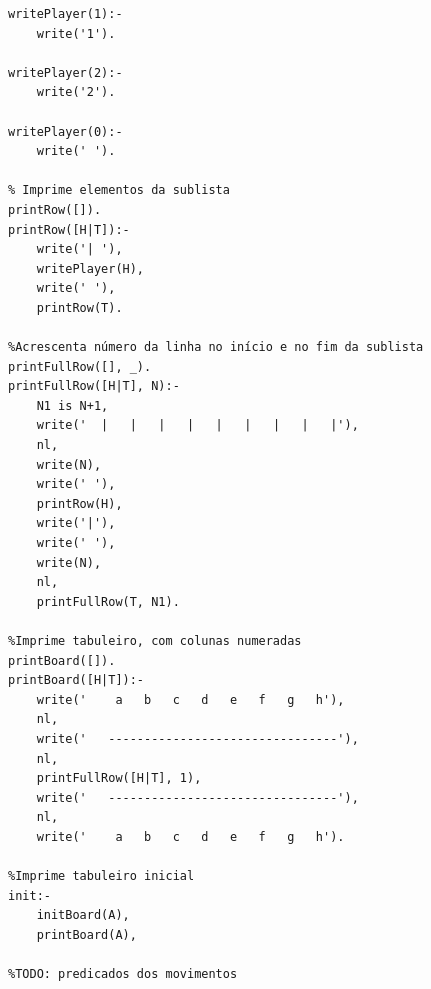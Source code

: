 \documentclass[15pt,a4paper]{article}
\begin{document}
\begin{code}[H]
	\begin{verbatim}
writePlayer(1):-
	write('1').

writePlayer(2):-
	write('2').

writePlayer(0):-
	write(' ').

% Imprime elementos da sublista
printRow([]).		
printRow([H|T]):-
	write('| '),
	writePlayer(H),
	write(' '),
	printRow(T).

%Acrescenta número da linha no início e no fim da sublista
printFullRow([], _).
printFullRow([H|T], N):-
	N1 is N+1,
	write('  |   |   |   |   |   |   |   |   |'),
	nl,
	write(N),
	write(' '),
	printRow(H),
	write('|'),
	write(' '),
	write(N),
	nl,
	printFullRow(T, N1).

%Imprime tabuleiro, com colunas numeradas
printBoard([]).
printBoard([H|T]):-
	write('    a   b   c   d   e   f   g   h'),
	nl,
	write('   --------------------------------'),
	nl,
	printFullRow([H|T], 1),
	write('   --------------------------------'),
	nl,
	write('    a   b   c   d   e   f   g   h').

%Imprime tabuleiro inicial
init:-
	initBoard(A),
	printBoard(A),

%TODO: predicados dos movimentos
\end{verbatim}
\end{code}
\end{document}

